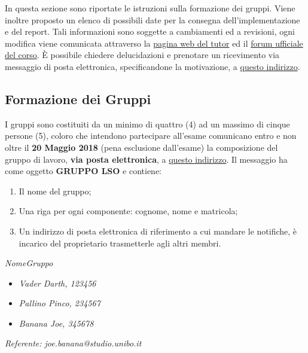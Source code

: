 
In questa sezione sono riportate le istruzioni sulla formazione dei gruppi.
Viene inoltre proposto un elenco di possibili date per la consegna
dell'implementazione e del report. Tali informazioni sono soggette a cambiamenti
ed a revisioni, ogni modifica viene comunicata attraverso la
\href{https://szingaro.github.io/}{pagina web del tutor} ed il
\href{https://groups.google.com/forum/#!forum/infoman-so}{forum ufficiale del
 corso}. È possibile chiedere delucidazioni e prenotare un ricevimento via
messaggio di posta elettronica, specificandone la motivazione, a
\href{mailto:stefanopio.zingaro@unibo.it}{questo indirizzo}.

\subsection{Formazione dei Gruppi}

I gruppi sono costituiti da un minimo di quattro (4) ad un massimo di cinque
persone (5), coloro che intendono partecipare all'esame comunicano entro e non
oltre il \textbf{20 Maggio 2018} (pena esclusione dall'esame) la composizione
del gruppo di lavoro, \textbf{via posta elettronica}, a
\href{mailto:stefanopio.zingaro@unibo.it}{questo indirizzo}. Il messaggio ha
come oggetto \textbf{GRUPPO LSO} e contiene:

\begin{enumerate}
 \item Il nome del gruppo;
 \item Una riga per ogni componente: cognome, nome e matricola;
 \item Un indirizzo di posta elettronica di riferimento a cui mandare le notifiche, è incarico del proprietario trasmetterle agli altri membri.
\end{enumerate}

\begin{tcolorbox}[colback=green!20!white,colframe=green!75!black,title=Email di esempio con oggetto \textbf{GRUPPO LSO}]
 \textit{NomeGruppo}
 \begin{itemize}
  \item \textit{Vader Darth, 123456}
  \item \textit{Pallino Pinco, 234567}
  \item \textit{Banana Joe, 345678}
 \end{itemize}
 \textit{Referente: joe.banana@studio.unibo.it}
\end{tcolorbox}

